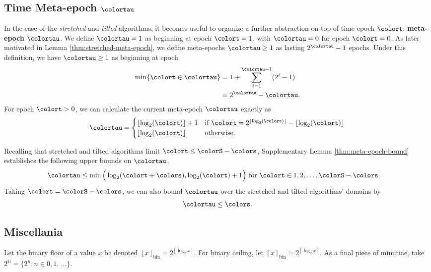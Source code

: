 \subsection{Time Meta-epoch $\colortau$}
\label{sec:notation-metaepoch}

In the case of the \textit{stretched} and \textit{tilted} algorithms, it becomes useful to organize a further abstraction on top of time epoch $\colort$: \textbf{meta-epoch} $\colortau$.
We define $\colortau=1$ as beginning at epoch $\colort = 1$, with $\colortau=0$ for epoch $\colort=0$.
As later motivated in Lemma \ref{thm:stretched-meta-epoch}, we define meta-epochs $\colortau\geq1$ as lasting $2^{\colortau} - 1$ epochs.
Under this definition, we have $\colortau\geq1$ as beginning at epoch
\begin{align}
\min\{\colort \in \colortau\}
&= 1 + \sum_{i=1}^{\colortau - 1} (2^{i} - 1) \\
&= 2^{\colortau} - \colortau.
\label{eqn:meta-epoch-defn}
\end{align}
For epoch $\colort > 0$, we can calculate the current meta-epoch $\colortau$ exactly as
\begin{align*}
\colortau
=
\begin{cases}
\left\lfloor \log_2(\colort) \right\rfloor + 1 & \text{if } \colort = 2^{\left\lfloor \log_2(\colort) \right\rfloor} - \left\lfloor \log_2(\colort) \right\rfloor \\
\left\lfloor \log_2(\colort) \right\rfloor & \text{otherwise.}
\end{cases}
\end{align*}

Recalling that stretched and tilted algorithms limit $\colort \leq \colorS - \colors$, Supplementary Lemma \ref{thm:meta-epoch-bound} establishes the following upper bounds on $\colortau$,
\begin{align*}
\colortau
&\leq
\min\Big(
  \log_2(\colort + \colors),
  \log_2(\colort) + 1
\Big)
\text{ for } \colort \in 1, 2, \ldots, \colorS - \colors.
\end{align*}
Taking $\colort = \colorS - \colors$, we can also bound $\colortau$ over the stretched and tilted algorithms' domains by
\begin{align*}
\colortau \leq \colors.
\end{align*}

\subsection{Miscellania}

Let the binary floor of a value $x$ be denoted $\left\lfloor x \right\rfloor_\mathrm{bin} = 2^{\left\lfloor \log_2 x \right\rfloor}$.
For binary ceiling, let $\left\lceil x \right\rceil_\mathrm{bin} = 2^{\left\lceil \log_2 x \right\rceil}$.
As a final piece of minutiae, take $2^{\mathbb{N}} = \{2^n : n \in 0, 1, \,\ldots \}$.
